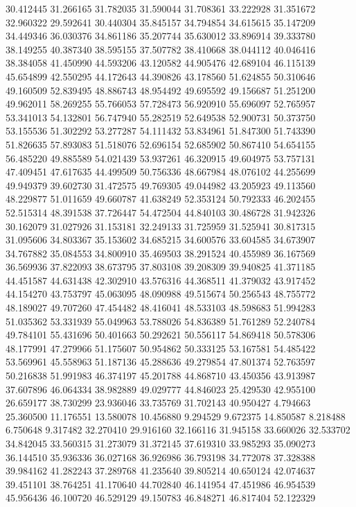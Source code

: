 30.412445
31.266165
31.782035
31.590044
31.708361
33.222928
31.351672
32.960322
29.592641
30.440304
35.845157
34.794854
34.615615
35.147209
34.449346
36.030376
34.861186
35.207744
35.630012
33.896914
39.333780
38.149255
40.387340
38.595155
37.507782
38.410668
38.044112
40.046416
38.384058
41.450990
44.593206
43.120582
44.905476
42.689104
46.115139
45.654899
42.550295
44.172643
44.390826
43.178560
51.624855
50.310646
49.160509
52.839495
48.886743
48.954492
49.695592
49.156687
51.251200
49.962011
58.269255
55.766053
57.728473
56.920910
55.696097
52.765957
53.341013
54.132801
56.747940
55.282519
52.649538
52.900731
50.373750
53.155536
51.302292
53.277287
54.111432
53.834961
51.847300
51.743390
51.826635
57.893083
51.518076
52.696154
52.685902
50.867410
54.654155
56.485220
49.885589
54.021439
53.937261
46.320915
49.604975
53.757131
47.409451
47.617635
44.499509
50.756336
48.667984
48.076102
44.255699
49.949379
39.602730
31.472575
49.769305
49.044982
43.205923
49.113560
48.229877
51.011659
49.660787
41.638249
52.353124
50.792333
46.202455
52.515314
48.391538
37.726447
54.472504
44.840103
30.486728
31.942326
30.162079
31.027926
31.153181
32.249133
31.725959
31.525941
30.817315
31.095606
34.803367
35.153602
34.685215
34.600576
33.604585
34.673907
34.767882
35.084553
34.800910
35.469503
38.291524
40.455989
36.167569
36.569936
37.822093
38.673795
37.803108
39.208309
39.940825
41.371185
44.451587
44.631438
42.302910
43.576316
44.368511
41.379032
43.917452
44.154270
43.753797
45.063095
48.090988
49.515674
50.256543
48.755772
48.189027
49.707260
47.454482
48.416041
48.533103
48.598683
51.994283
51.035362
53.331939
55.049963
53.788026
54.836389
51.761289
52.240784
49.784101
55.431696
50.401663
50.292621
50.556117
54.869418
50.578306
48.177991
47.279966
51.175607
50.954862
50.333125
53.167581
54.485422
53.569961
45.558963
51.187136
45.288636
49.279854
47.801374
52.763597
50.216838
51.991983
46.374197
45.201788
44.868710
43.450356
43.913987
37.607896
46.064334
38.982889
49.029777
44.846023
25.429530
42.955100
26.659177
38.730299
23.936046
33.735769
31.702143
40.950427
4.794663
25.360500
11.176551
13.580078
10.456880
9.294529
9.672375
14.850587
8.218488
6.750648
9.317482
32.270410
29.916160
32.166116
31.945158
33.660026
32.533702
34.842045
33.560315
31.273079
31.372145
37.619310
33.985293
35.090273
36.144510
35.936336
36.027168
36.926986
36.793198
34.772078
37.328388
39.984162
41.282243
37.289768
41.235640
39.805214
40.650124
42.074637
39.451101
38.764251
41.170640
44.702840
46.141954
47.451986
46.954539
45.956436
46.100720
46.529129
49.150783
46.848271
46.817404
52.122329
